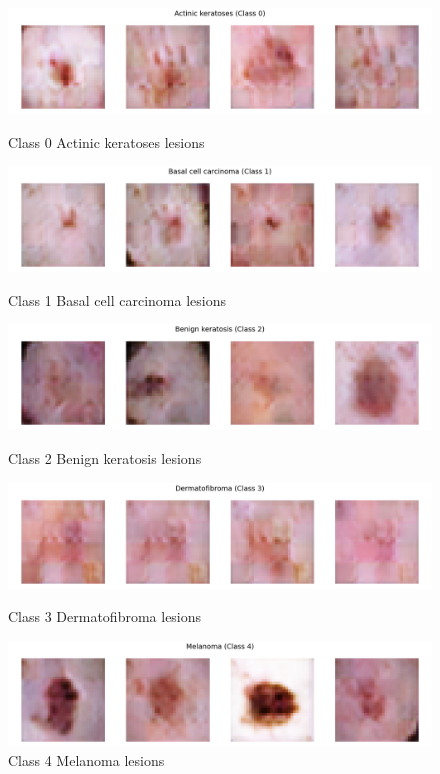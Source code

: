 \documentclass{article}
\begin{document}
\begin{figure}[htbp]
    \centering
    \begin{minipage}{0.45\textwidth}
        \centering
        \captionsetup{labelformat=empty}  
        \includegraphics[width=\linewidth]{class_0_Actinic_keratoses.png}
        \caption{Class 0 Actinic keratoses lesions}
        
        \includegraphics[width=\linewidth]{class_1_Basal_cell_carcinoma.png}
        \caption{Class 1 Basal cell carcinoma lesions}
        
        \includegraphics[width=\linewidth]{class_2_Benign_keratosis.png}
        \caption{Class 2 Benign keratosis lesions}
        
        \includegraphics[width=\linewidth]{class_3_Dermatofibroma.png}
        \caption{Class 3 Dermatofibroma lesions}
        
        \includegraphics[width=\linewidth]{class_4_Melanoma.png}
        \caption{Class 4 Melanoma lesions}
        

\end{minipage}
\end{figure}
\end{document}
